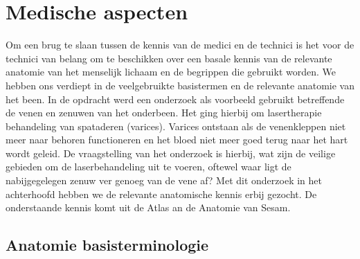 \section{Medische aspecten}
\label{Medische aspecten}


Om een brug te slaan tussen de kennis van de medici en de technici is het voor de technici van belang om te beschikken over een basale kennis van de relevante anatomie van het menselijk lichaam en de begrippen die gebruikt worden. 
We hebben ons verdiept in de veelgebruikte basistermen en de relevante anatomie van het been. 
In de opdracht werd een onderzoek als voorbeeld gebruikt betreffende de venen en zenuwen van het onderbeen. 
Het ging hierbij om lasertherapie behandeling van spataderen (varices).
 Varices ontstaan als de venenkleppen niet meer naar behoren functioneren en het bloed niet meer goed terug naar het hart wordt geleid. 
De vraagstelling van het onderzoek is hierbij, wat zijn de veilige gebieden om de laserbehandeling uit te voeren, oftewel waar ligt de nabijgegelegen zenuw ver genoeg van de vene af? 
Met dit onderzoek in het achterhoofd hebben we de relevante anatomische kennis erbij gezocht.
De onderstaande kennis komt uit de Atlas an de Anatomie van Sesam.\cite{sesam}

\subsection{Anatomie basisterminologie}

